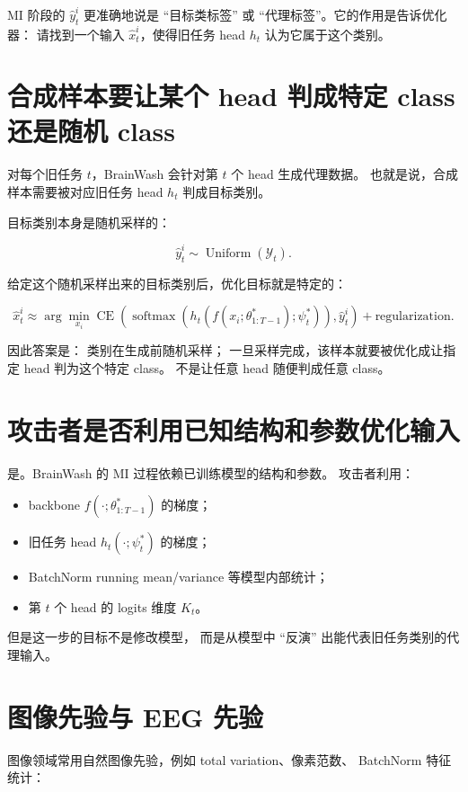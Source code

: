 \documentclass[11pt]{article}
\begin{document}
MI 阶段的 \(\hat{y}_t^i\) 更准确地说是 ``目标类标签'' 或
``代理标签''。它的作用是告诉优化器：
请找到一个输入 \(\hat{x}_t^i\)，使得旧任务 head \(h_t\) 认为它属于这个类别。

\section{合成样本要让某个 head 判成特定 class 还是随机 class}

对每个旧任务 \(t\)，BrainWash 会针对第 \(t\) 个 head 生成代理数据。
也就是说，合成样本需要被对应旧任务 head \(h_t\) 判成目标类别。

目标类别本身是随机采样的：

\[
\hat{y}_t^i
\sim
\operatorname{Uniform}(\mathcal{Y}_t).
\]

给定这个随机采样出来的目标类别后，优化目标就是特定的：

\[
\hat{x}_t^i
\approx
\arg\min_{x_i}
\operatorname{CE}
\left(
\operatorname{softmax}
\left(
h_t(f(x_i;\theta_{1:T-1}^{*});\psi_t^{*})
\right),
\hat{y}_t^i
\right)
+
\text{regularization}.
\]

因此答案是：
类别在生成前随机采样；
一旦采样完成，该样本就要被优化成让指定 head 判为这个特定 class。
不是让任意 head 随便判成任意 class。

\section{攻击者是否利用已知结构和参数优化输入}

是。BrainWash 的 MI 过程依赖已训练模型的结构和参数。
攻击者利用：

\begin{itemize}
  \item backbone \(f(\cdot;\theta_{1:T-1}^{*})\) 的梯度；
  \item 旧任务 head \(h_t(\cdot;\psi_t^{*})\) 的梯度；
  \item BatchNorm running mean/variance 等模型内部统计；
  \item 第 \(t\) 个 head 的 logits 维度 \(K_t\)。
\end{itemize}

但是这一步的目标不是修改模型，
而是从模型中 ``反演'' 出能代表旧任务类别的代理输入。

\section{图像先验与 EEG 先验}

图像领域常用自然图像先验，例如 total variation、像素范数、
BatchNorm 特征统计：
\end{document}
